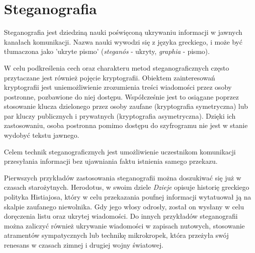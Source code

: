 
\chapter{Steganografia}\label{chap:steganography}
{

    Steganografia jest dziedziną nauki poświęconą ukrywaniu informacji w jawnych kanałach komunikacji.
    Nazwa nauki wywodzi się z języka greckiego, i może być tłumaczona jako 'ukryte pismo' (\textit{steganós} - ukryty, \textit{graphia} - pismo).

    W celu podkreślenia cech oraz charakteru metod steganograficznych często przytaczane jest również pojęcie kryptografii.
    Obiektem zainteresowań kryptografii jest uniemożliwienie zrozumienia treści wiadomości przez osoby postronne,
    pozbawione do niej dostępu. Współcześnie jest to osiągane poprzez stosowanie klucza dzielonego przez osoby zaufane
    (kryptografia symetryczna) lub par kluczy publicznych i prywatnych (kryptografia asymetryczna). Dzięki ich zastosowaniu,
    osoba postronna pomimo dostępu do szyfrogramu nie jest w stanie wydobyć tekstu jawnego.

    Celem technik steganograficznych jest umożliwienie uczestnikom komunikacji przesyłania informacji bez ujawniania faktu istnienia samego przekazu.
    
    Pierwszych przykładów zastosowania steganografii można doszukiwać się już w czasach starożytnych.
    Herodotus, w swoim dziele \textit{Dzieje} opisuje historię greckiego polityka Histiajosa,
    który w celu przekazania poufnej informacji wytatuował ją na skalpie zaufanego niewolnika.
    Gdy jego włosy odrosły, został on wysłany w celu doręczenia listu oraz ukrytej wiadomości.
    Do innych przykładów steganografii można zaliczyć również ukrywanie wiadomości w zapisach nutowych,
    stosowanie atramentów sympatycznych lub technikę mikrokropek,
    która przeżyła swój renesans w czasach zimnej i drugiej wojny światowej.
    
}
